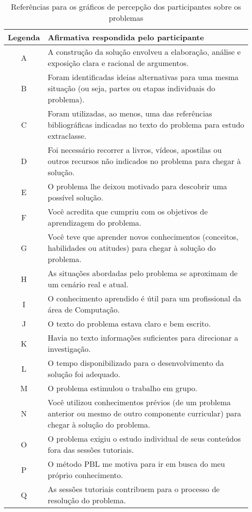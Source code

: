 \begin{table}[h]
\caption{Referências para os gráficos de percepção dos participantes sobre os problemas}
\label{tabela-ref-graficos}
\begin{tabular}{c|p{14.6cm}}
Legenda & Afirmativa respondida pelo participante \\
\hline
A & A construção da solução envolveu a elaboração, análise e exposição clara e racional de argumentos.\\
\hline
B & Foram identificadas ideias alternativas para uma mesma situação (ou seja, partes ou etapas individuais do problema).\\
\hline
C & Foram utilizadas, ao menos, uma das referências bibliográficas indicadas no texto do problema para estudo extraclasse.\\
\hline
D & Foi necessário recorrer a livros, vídeos, apostilas ou outros recursos não indicados no problema para chegar à solução.\\
\hline
E & O problema lhe deixou motivado para descobrir uma possível solução.\\
\hline
F & Você acredita que cumpriu com os objetivos de aprendizagem do problema.\\
\hline
G & Você teve que aprender novos conhecimentos (conceitos, habilidades ou atitudes) para chegar à solução do problema.\\
\hline
H & As situações abordadas pelo problema se aproximam de um cenário real e atual.\\
\hline
I & O conhecimento aprendido é útil para um profissional da área de Computação.\\
\hline
J & O texto do problema estava claro e bem escrito.\\
\hline
K & Havia no texto informações suficientes para direcionar a investigação.\\
\hline
L & O tempo disponibilizado para o desenvolvimento da solução foi adequado.\\
\hline
M & O problema estimulou o trabalho em grupo.\\
\hline
N & Você utilizou conhecimentos prévios (de um problema anterior ou mesmo de outro componente curricular) para chegar à solução do problema.\\
\hline
O & O problema exigiu o estudo individual de seus conteúdos fora das sessões tutoriais.\\
\hline
P & O método PBL me motiva para ir em busca do meu próprio conhecimento.\\
\hline
Q & As sessões tutoriais contribuem para o processo de resolução do problema.\\

\end{tabular}
\end{table}
